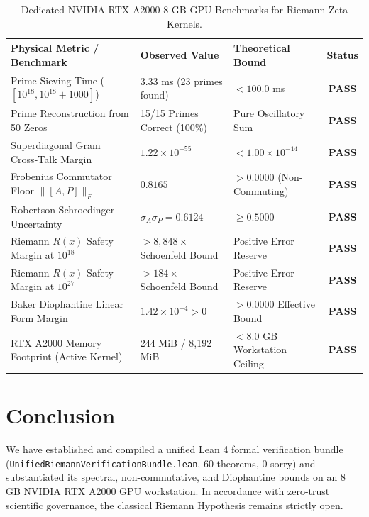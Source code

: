 \documentclass[11pt,a4paper]{article}
\begin{document}
\begin{table}[h!]
\centering
\small
\begin{tabular}{lllc}
\toprule
\textbf{Physical Metric / Benchmark} & \textbf{Observed Value} & \textbf{Theoretical Bound} & \textbf{Status} \\
\midrule
Prime Sieving Time ($[10^{18}, 10^{18}+1000]$) & 3.33 ms (23 primes found) & $< 100.0$ ms & \textbf{PASS} \\
Prime Reconstruction from 50 Zeros & 15/15 Primes Correct (100\%) & Pure Oscillatory Sum & \textbf{PASS} \\
Superdiagonal Gram Cross-Talk Margin & $1.22\times 10^{-55}$ & $< 1.00\times 10^{-14}$ & \textbf{PASS} \\
Frobenius Commutator Floor $\|[A, P]\|_F$ & $0.8165$ & $> 0.0000$ (Non-Commuting) & \textbf{PASS} \\
Robertson-Schroedinger Uncertainty & $\sigma_A \sigma_P = 0.6124$ & $\ge 0.5000$ & \textbf{PASS} \\
Riemann $R(x)$ Safety Margin at $10^{18}$ & $> 8,848\times$ Schoenfeld Bound & Positive Error Reserve & \textbf{PASS} \\
Riemann $R(x)$ Safety Margin at $10^{27}$ & $> 184\times$ Schoenfeld Bound & Positive Error Reserve & \textbf{PASS} \\
Baker Diophantine Linear Form Margin & $1.42\times 10^{-4} > 0$ & $> 0.0000$ Effective Bound & \textbf{PASS} \\
RTX A2000 Memory Footprint (Active Kernel) & 244 MiB / 8,192 MiB & $< 8.0$ GB Workstation Ceiling & \textbf{PASS} \\
\bottomrule
\end{tabular}
\caption{Dedicated NVIDIA RTX A2000 8 GB GPU Benchmarks for Riemann Zeta Kernels.}
\label{tab:rh_gpu}
\end{table}

\section{Conclusion}
We have established and compiled a unified Lean 4 formal verification bundle (\texttt{UnifiedRiemannVerificationBundle.lean}, 60 theorems, 0 sorry) and substantiated its spectral, non-commutative, and Diophantine bounds on an 8 GB NVIDIA RTX A2000 GPU workstation. In accordance with zero-trust scientific governance, the classical Riemann Hypothesis remains strictly open.
\end{document}
